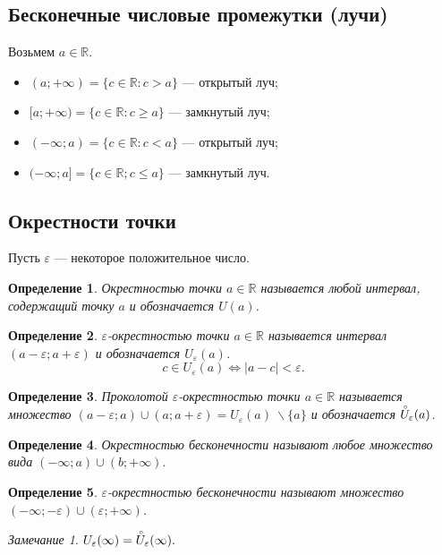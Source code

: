 \documentclass[a4paper,12pt]{article} %
\newtheorem{definition}{Определение}[section]
\theoremstyle{remark}
\newtheorem*{remark}{Замечание}
\theoremstyle{definition}
\begin{document}
\subsection{Бесконечные числовые промежутки (лучи)}
Возьмем $a\in \mathbb{R}$.
\begin{itemize}
	\item $(a; +\infty) = \{c \in \mathbb{R} : c > a\} $ --- открытый луч;
	\item $[a; +\infty) = \{c \in \mathbb{R} : c \ge a\} $ --- замкнутый луч;
	\item $(-\infty; a) = \{c\in \mathbb{R}:c<a\} $ --- открытый луч;
	\item $(-\infty; a] = \{c \in \mathbb{R}; c \le a\} $ --- замкнутый луч.
\end{itemize}


\subsection{Окрестности точки}
Пусть $\varepsilon$ --- некоторое положительное число.
\begin{definition}
	Окрестностью точки $a \in \mathbb{R}$ называется любой интервал, содержащий точку $a$ и обозначается $U(a)$.
\end{definition}
\begin{definition}
	$\varepsilon$-окрестностью точки $a\in \mathbb{R}$ называется интервал $(a-\varepsilon;a+\varepsilon)$ и обозначается $U_\varepsilon(a)$.
	\[
	c\in U_\varepsilon(a) \iff |a-c| < \varepsilon
	.\] 
\end{definition}

\begin{definition}
	Проколотой $\varepsilon$-окрестностью точки $a\in \mathbb{R}$ называется множество $(a-\varepsilon;a)\cup (a; a+\varepsilon) = U_\varepsilon(a)\ \backslash \{a\}$ и обозначается $\accentset{\circ}{U}_\varepsilon(a)$.
\end{definition}

\begin{definition}
	Окрестностью бесконечности называют любое множество вида $(-\infty; a)\cup (b; +\infty).$
\end{definition}
\begin{definition}
	$\varepsilon$-окрестностью бесконечности называют множество $(-\infty; -\varepsilon)\cup (\varepsilon; +\infty)$.
\end{definition}
\begin{remark}
$U_\varepsilon(\infty)=\accentset{\circ}{U}_\varepsilon(\infty).$
\end{remark}
\end{document}
